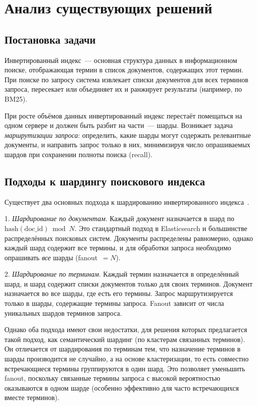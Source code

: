 \documentclass[14pt, a4paper]{article}
\begin{document}
	\section{Анализ существующих решений}

	\subsection{Постановка задачи}

	Инвертированный индекс~--- основная структура данных в информационном поиске, отображающая термин в список документов, содержащих этот термин.
	При поиске по запросу система извлекает списки документов для всех терминов запроса, пересекает или объединяет их и ранжирует результаты (например, по BM25).

	При росте объёмов данных инвертированный индекс перестаёт помещаться на одном сервере и должен быть разбит на части~--- шарды.
	Возникает задача \textit{маршрутизации запроса}: определить, какие шарды могут содержать релевантные документы, и направить запрос только в них, минимизируя число опрашиваемых шардов при сохранении полноты поиска (recall).

	\subsection{Подходы к шардингу поискового индекса}

	Существует два основных подхода к шардированию инвертированного индекса~.

	1. \textit{Шардирование по документам}.
	Каждый документ назначается в шард по $\mathrm{hash}(\mathrm{doc\_id}) \bmod N$.
	Это стандартный подход в Elasticsearch и большинстве распределённых поисковых систем.
	Документы распределены равномерно, однако каждый шард содержит все термины, и для обработки запроса необходимо опрашивать \textit{все} шарды (fanout~$= N$).

	2. \textit{Шардирование по терминам}.
	Каждый термин назначается в определённый шард, и шард содержит списки документов только для своих терминов.
	Документ назначается во все шарды, где есть его термины.
	Запрос маршрутизируется только в шарды, содержащие термины запроса.
	Fanout зависит от числа уникальных шардов терминов запроса.

	Однако оба подхода имеют свои недостатки, для решения которых предлагается такой подход, как семантический шардинг (по кластерам связанных терминов).
	Он отличается от шардирования по терминам тем, что назначение терминов в шарды производится не случайно, а на основе кластеризации, то есть совместно встречающиеся термины группируются в один шард.
	Это позволяет уменьшить fanout, поскольку связанные термины запроса с высокой вероятностью оказываются в одном шарде (особенно эффективно для часто встречающихся вместе терминов).
\end{document}
